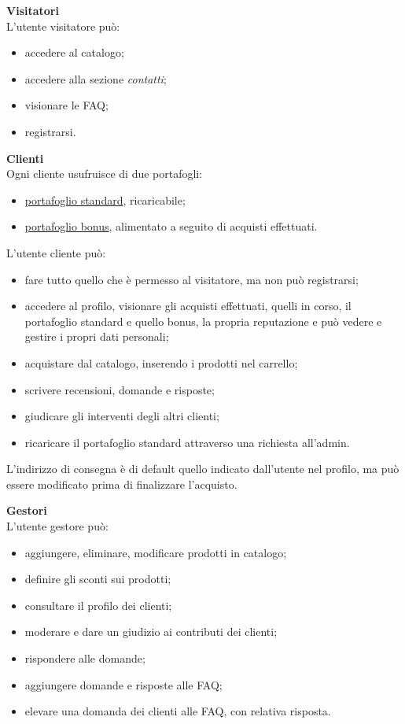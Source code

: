 \documentclass[a4paper, 14pt]{article}
\begin{document}
\begin{flushleft}
			\bigskip \textbf{Visitatori} \\ \smallskip
			L'utente visitatore può:
			\begin{itemize}
				\item accedere al catalogo;
				\item accedere alla sezione \textit{contatti};
				\item visionare le FAQ;
				\item registrarsi.
			\end{itemize}
			
			\bigskip \textbf{Clienti} \\ \smallskip
			Ogni cliente usufruisce di due portafogli:
			\begin{itemize}
				\item \underline{portafoglio standard}, ricaricabile;
				\item \underline{portafoglio bonus}, alimentato a seguito di acquisti effettuati.
			\end{itemize}
			
			L'utente cliente può:
			\begin{itemize}
				\item fare tutto quello che è permesso al visitatore, ma non può registrarsi;
				\item accedere al profilo, visionare gli acquisti effettuati, quelli in corso, il portafoglio
				standard e quello bonus, la propria reputazione e può vedere e gestire i propri dati personali;
				\item acquistare dal catalogo, inserendo i prodotti nel carrello;
				\item scrivere recensioni, domande e risposte;
				\item giudicare gli interventi degli altri clienti;
				\item ricaricare il portafoglio standard attraverso una richiesta all'admin.
			\end{itemize}
			L’indirizzo di consegna è di default quello indicato dall’utente nel profilo, ma può essere
			modificato prima di finalizzare l’acquisto. 
		
			\bigskip \textbf{Gestori} \\ \smallskip
			L'utente gestore può:
			\begin{itemize}
				\item aggiungere, eliminare, modificare prodotti in catalogo;
				\item definire gli sconti sui prodotti;
				\item consultare il profilo dei clienti;
				\item moderare e dare un giudizio ai contributi dei clienti;
				\item rispondere alle domande;
				\item aggiungere domande e risposte alle FAQ;
				\item elevare una domanda dei clienti alle FAQ, con relativa risposta.
			\end{itemize}
		

\end{flushleft}
\end{document}
